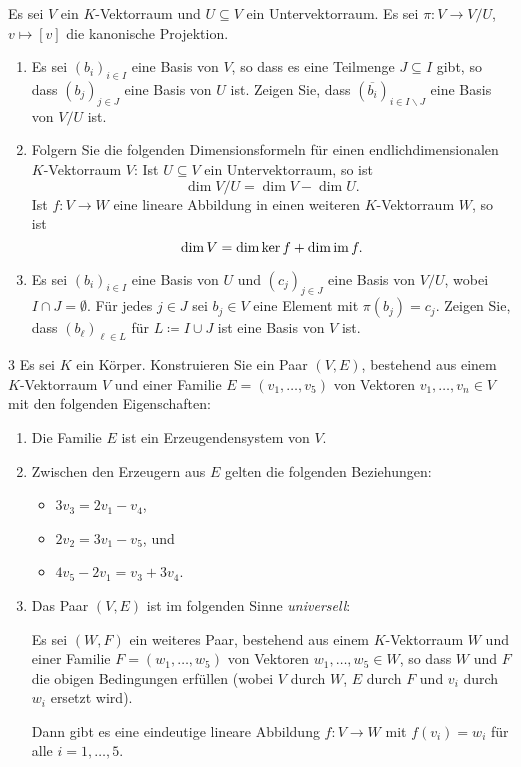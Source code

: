 \begin{question}[subtitle = Basen von Quotientenvektorräumen]{3}
  Es sei $V$ ein $K$-Vektorraum und $U \subseteq V$ ein Untervektorraum.
  Es sei $\pi \colon V \to V\!/U$, $v \mapsto [v]$ die kanonische Projektion.
  \begin{enumerate}[leftmargin=*]
    \item
      Es sei $(b_i)_{i \in I}$ eine Basis von $V$, so dass es eine Teilmenge $J \subseteq I$ gibt, so dass $(b_j)_{j \in J}$ eine Basis von $U$ ist.
      Zeigen Sie, dass $(\overline{b_i})_{i \in I \smallsetminus J}$ eine Basis von $V\!/U$ ist.
    \item
      Folgern Sie die folgenden Di\-men\-si\-ons\-for\-meln für einen end\-lich\-di\-men\-si\-o\-na\-len $K$-Vek\-tor\-raum $V$:
      Ist $U \subseteq V$ ein Untervektorraum, so ist
      \[
        \dim V\!/U = \dim V - \dim U.
      \]
      Ist $f \colon V \to W$ eine lineare Abbildung in einen weiteren $K$-Vektorraum $W$, so ist
      \[
        \dim V = \dim \ker f + \dim \operatorname{im} f.
      \]
    \item
      Es sei $(b_i)_{i \in I}$ eine Basis von $U$ und $(c_j)_{j \in J}$ eine Basis von $V\!/U$, wobei $I \cap J = \emptyset$.
      Für jedes $j \in J$ sei $b_j \in V$ eine Element mit $\pi(b_j) = c_j$.
      Zeigen Sie, dass $(b_\ell)_{\ell \in L}$ für $L \coloneqq I \cup J$ ist eine Basis von $V$ ist.
  \end{enumerate}
\end{question}


\begin{question}[subtitle = Definition von Vektorräumen über Erzeuger und Relationen]{3}
  Es sei $K$ ein Körper.
  Konstruieren Sie ein Paar $(V,E)$, bestehend aus einem $K$-Vektorraum $V$ und einer Familie $E = (v_1, \dotsc, v_5)$ von Vektoren $v_1, \dotsc, v_n \in V$ mit den folgenden Eigenschaften:
  \begin{enumerate}[leftmargin=*]
    \item
      Die Familie $E$ ist ein Erzeugendensystem von $V$.
    \item
      Zwischen den Erzeugern aus $E$ gelten die folgenden Beziehungen:
      \begin{itemize}
        \item
          $3 v_3 = 2 v_1 - v_4$,
        \item
          $2 v_2 = 3 v_1 - v_5$, und
        \item
          $4 v_5 - 2 v_1 = v_3 + 3 v_4$.
      \end{itemize}
    \item
      Das Paar $(V,E)$ ist im folgenden Sinne \emph{universell}:
      
      Es sei $(W, F)$ ein weiteres Paar, bestehend aus einem $K$-Vektorraum $W$ und einer Familie $F = (w_1, \dotsc, w_5)$ von Vektoren $w_1, \dotsc, w_5 \in W$, so dass $W$ und $F$ die obigen Bedingungen erfüllen (wobei $V$ durch $W$, $E$ durch $F$ und $v_i$ durch $w_i$ ersetzt wird).
      
      Dann gibt es eine eindeutige lineare Abbildung $f \colon V \to W$ mit $f(v_i) = w_i$ für alle $i = 1, \dotsc, 5$.
  \end{enumerate}
\end{question}


